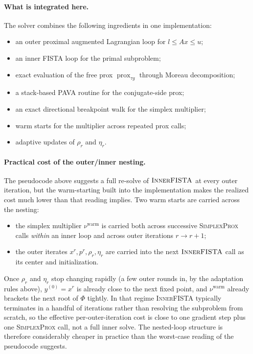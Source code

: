 \documentclass[11pt]{article}
\begin{document}
\paragraph*{What is integrated here.}
The solver combines the following ingredients in one implementation:
\begin{itemize}[topsep=0.3em,itemsep=0.2em]
\item an outer proximal augmented Lagrangian loop for \(l \le Ax \le u\);
\item an inner FISTA loop for the primal subproblem;
\item exact evaluation of the free prox \(\operatorname{prox}_{\tau g}\) through
Moreau decomposition;
\item a stack-based PAVA routine for the conjugate-side prox;
\item an exact directional breakpoint walk for the simplex multiplier;
\item warm starts for the multiplier across repeated prox calls;
\item adaptive updates of \(\rho_r\) and \(\eta_r\).
\end{itemize}

\paragraph*{Practical cost of the outer/inner nesting.}
The pseudocode above suggests a full re-solve of \(\textsc{InnerFISTA}\) at
every outer iteration, but the warm-starting built into the implementation
makes the realized cost much lower than that reading implies. Two warm starts
are carried across the nesting:
\begin{itemize}[topsep=0.3em,itemsep=0.2em]
\item the simplex multiplier \(\nu^{\mathrm{warm}}\) is carried both across
successive \textsc{SimplexProx} calls \emph{within} an inner loop and across
outer iterations \(r \to r+1\);
\item the outer iterates \(x^r, p^r, \rho_r, \eta_r\) are carried into the
next \(\textsc{InnerFISTA}\) call as its center and initialization.
\end{itemize}
Once \(\rho_r\) and \(\eta_r\) stop changing rapidly (a few outer rounds in,
by the adaptation rules above), \(y^{(0)} = x^r\) is already close to the next
fixed point, and \(\nu^{\mathrm{warm}}\) already brackets the next root of
\(\Phi\) tightly. In that regime \textsc{InnerFISTA} typically terminates in a
handful of iterations rather than resolving the subproblem from scratch, so
the effective per-outer-iteration cost is close to one gradient step plus one
\textsc{SimplexProx} call, not a full inner solve. The nested-loop structure
is therefore considerably cheaper in practice than the worst-case reading of
the pseudocode suggests.
\end{document}
